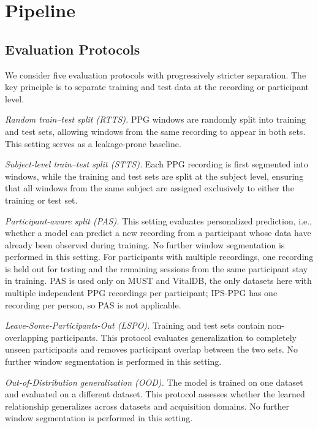 \documentclass{article}
\begin{document}
\section{Pipeline}
\subsection{Evaluation Protocols}
\label{sec:evaluation_protocols}
We consider five evaluation protocols with progressively stricter separation.
The key principle is to separate training and test data at the recording or participant level. 

\textit{Random train--test split (RTTS).}
PPG windows are randomly split into training and test sets, allowing windows from the same recording to appear in both sets. This setting serves as a leakage-prone baseline.

\textit{Subject-level train–test split (STTS).} Each PPG recording is first segmented into windows, while the training and test sets are split at the subject level, ensuring that all windows from the same subject are assigned exclusively to either the training or test set.

\textit{Participant-aware split (PAS).}
This setting evaluates personalized prediction, i.e., whether a model can predict a new recording from a participant whose data have already been observed during training. No further window segmentation is performed in this setting. For participants with multiple recordings, one recording is held out for testing and the remaining sessions from the same participant stay in training. PAS is used only on MUST and VitalDB, the only datasets here with multiple independent PPG recordings per participant; IPS-PPG has one recording per person, so PAS is not applicable.

\textit{Leave-Some-Participants-Out (LSPO).}
Training and test sets contain non-overlapping participants. This protocol evaluates generalization to completely unseen participants and removes participant overlap between the two sets. No further window segmentation is performed in this setting.

\textit{Out-of-Distribution generalization (OOD).}
The model is trained on one dataset and evaluated on a different dataset. This protocol assesses whether the learned relationship generalizes across datasets and acquisition domains. No further window segmentation is performed in this setting. 
\end{document}
